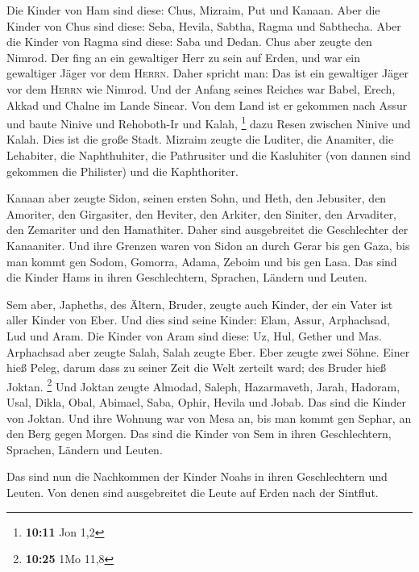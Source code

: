  Die Kinder von Ham sind diese: Chus, Mizraim, Put und
Kanaan.  Aber die Kinder von Chus sind diese: Seba,
Hevila, Sabtha, Ragma und Sabthecha. Aber die Kinder von Ragma sind
diese: Saba und Dedan.  Chus aber zeugte den Nimrod. Der
fing an ein gewaltiger Herr zu sein auf Erden,  und war
ein gewaltiger Jäger vor dem \textsc{Herrn}. Daher spricht man: Das ist
ein gewaltiger Jäger vor dem \textsc{Herrn} wie Nimrod. 
Und der Anfang seines Reiches war Babel, Erech, Akkad und Chalne im
Lande Sinear.  Von dem Land ist er gekommen nach Assur
und baute Ninive und Rehoboth-Ir und Kalah, \footnote{\textbf{10:11} Jon
  1,2}  dazu Resen zwischen Ninive und Kalah. Dies ist
die große Stadt.  Mizraim zeugte die Luditer, die
Anamiter, die Lehabiter, die Naphthuhiter,  die
Pathrusiter und die Kasluhiter (von dannen sind gekommen die Philister)
und die Kaphthoriter.

 Kanaan aber zeugte Sidon, seinen ersten Sohn, und Heth,
 den Jebusiter, den Amoriter, den Girgasiter,
 den Heviter, den Arkiter, den Siniter, 
den Arvaditer, den Zemariter und den Hamathiter. Daher sind ausgebreitet
die Geschlechter der Kanaaniter.  Und ihre Grenzen waren
von Sidon an durch Gerar bis gen Gaza, bis man kommt gen Sodom, Gomorra,
Adama, Zeboim und bis gen Lasa.  Das sind die Kinder Hams
in ihren Geschlechtern, Sprachen, Ländern und Leuten.

 Sem aber, Japheths, des Ältern, Bruder, zeugte auch
Kinder, der ein Vater ist aller Kinder von Eber.  Und
dies sind seine Kinder: Elam, Assur, Arphachsad, Lud und Aram.
 Die Kinder von Aram sind diese: Uz, Hul, Gether und Mas.
 Arphachsad aber zeugte Salah, Salah zeugte Eber.
 Eber zeugte zwei Söhne. Einer hieß Peleg, darum dass zu
seiner Zeit die Welt zerteilt ward; des Bruder hieß Joktan. \footnote{\textbf{10:25}
  1Mo 11,8}  Und Joktan zeugte Almodad, Saleph,
Hazarmaveth, Jarah,  Hadoram, Usal, Dikla,
 Obal, Abimael, Saba,  Ophir, Hevila und
Jobab. Das sind die Kinder von Joktan.  Und ihre Wohnung
war von Mesa an, bis man kommt gen Sephar, an den Berg gegen Morgen.
 Das sind die Kinder von Sem in ihren Geschlechtern,
Sprachen, Ländern und Leuten.

 Das sind nun die Nachkommen der Kinder Noahs in ihren
Geschlechtern und Leuten. Von denen sind ausgebreitet die Leute auf
Erden nach der Sintflut.

